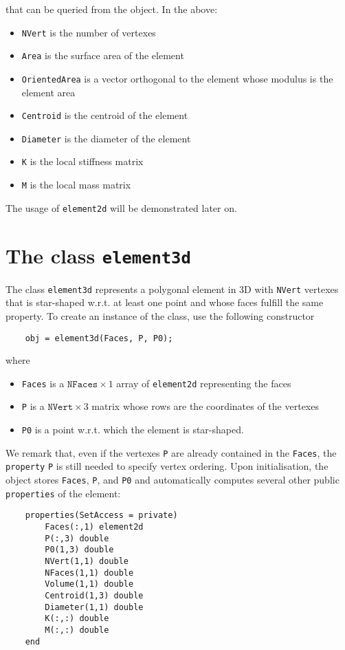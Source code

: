 \documentclass[a4paper]{article}
\begin{document}
\noindent
that can be queried from the object. In the above:
\begin{itemize}
\item \texttt{NVert} is the number of vertexes
\item \texttt{Area} is the surface area of the element
\item \texttt{OrientedArea} is a vector orthogonal to the element whose modulus is the element area
\item \texttt{Centroid} is the centroid of the element
\item \texttt{Diameter} is the diameter of the element
\item \texttt{K} is the local stiffness matrix
\item \texttt{M} is the local mass matrix
\end{itemize}

\noindent
The usage of \texttt{element2d} will be demonstrated later on.

\section{The class \texttt{element3d}}
The class \texttt{element3d} represents a polygonal element in 3D with \texttt{NVert} vertexes that is star-shaped w.r.t. at least one point and whose faces fulfill the same property.  To create an instance of the class, use the following constructor

\begin{lstlisting}
	obj = element3d(Faces, P, P0);
\end{lstlisting}
%
where 
\begin{itemize}
\item \texttt{Faces} is a $\texttt{NFaces} \times 1$ array of \texttt{element2d} representing the faces
\item \texttt{P} is a $\texttt{NVert} \times 3$ matrix whose rows are the coordinates of the vertexes
\item \texttt{P0} is a point w.r.t. which the element is star-shaped.
\end{itemize}
We remark that, even if the vertexes \texttt{P} are already contained in the \texttt{Faces}, the \texttt{property} \texttt{P} is still needed to specify vertex ordering. Upon initialisation, the object stores \texttt{Faces}, \texttt{P}, and \texttt{P0} and automatically computes several other public \texttt{properties} of the element:

\begin{lstlisting}
	properties(SetAccess = private)
		Faces(:,1) element2d
		P(:,3) double
		P0(1,3) double
		NVert(1,1) double
		NFaces(1,1) double
		Volume(1,1) double
		Centroid(1,3) double
		Diameter(1,1) double
		K(:,:) double
		M(:,:) double
	end
\end{lstlisting}
\end{document}
